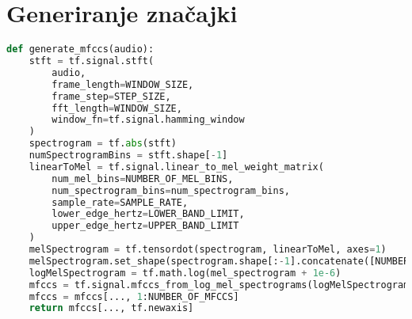 \chapter{Generiranje značajki}
\label{add:mfcc}

\begin{lstlisting}[language=Python, caption=Generiranje značajki korišteno u Jupyter bilježnici]
def generate_mfccs(audio):
    stft = tf.signal.stft(
        audio,
        frame_length=WINDOW_SIZE,
        frame_step=STEP_SIZE,
        fft_length=WINDOW_SIZE,
        window_fn=tf.signal.hamming_window
    )
    spectrogram = tf.abs(stft)
    numSpectrogramBins = stft.shape[-1]
    linearToMel = tf.signal.linear_to_mel_weight_matrix(
        num_mel_bins=NUMBER_OF_MEL_BINS,
        num_spectrogram_bins=num_spectrogram_bins,
        sample_rate=SAMPLE_RATE,
        lower_edge_hertz=LOWER_BAND_LIMIT,
        upper_edge_hertz=UPPER_BAND_LIMIT
    )
    melSpectrogram = tf.tensordot(spectrogram, linearToMel, axes=1)
    melSpectrogram.set_shape(spectrogram.shape[:-1].concatenate([NUMBER_OF_MEL_BINS]))
    logMelSpectrogram = tf.math.log(mel_spectrogram + 1e-6)
    mfccs = tf.signal.mfccs_from_log_mel_spectrograms(logMelSpectrogram)
    mfccs = mfccs[..., 1:NUMBER_OF_MFCCS] 
    return mfccs[..., tf.newaxis]
\end{lstlisting}